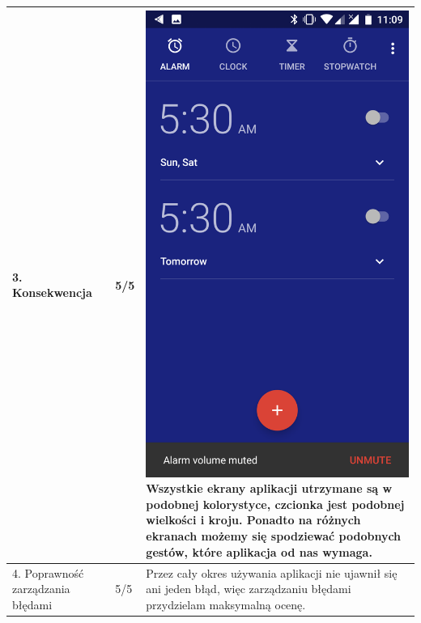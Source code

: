 \documentclass[12pt]{article}
\begin{document}
\begin{longtable}{|p{}|p{}|p{}|}
        \hline
        3. Konsekwencja & 5/5 & \includegraphics[scale=0.1]{volumemuted.png} Wszystkie ekrany aplikacji utrzymane są w podobnej kolorystyce, czcionka jest podobnej wielkości i kroju. Ponadto na różnych ekranach możemy się spodziewać podobnych gestów, które aplikacja od nas wymaga.\\
        \hline
        4. Poprawność zarządzania błędami & 5/5 & Przez cały okres używania aplikacji nie ujawnił się ani jeden błąd, więc zarządzaniu błędami przydzielam maksymalną ocenę.\\
        \hline
    \end{longtable}
\end{document}
